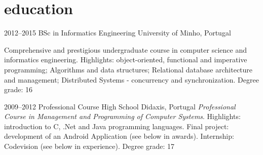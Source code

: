 \documentclass[]{friggeri-cv} %
\begin{document}
\section{education}

\begin{entrylist}
\entry
{2012--2015}
{BSc in Informatics Engineering }
{University of Minho, Portugal}
{
Comprehensive and prestigious undergraduate course in computer science and informatics engineering. Highlights: object-oriented, functional and imperative programming; Algorithms and data structures; Relational database architecture and management; Distributed Systems - concurrency and synchronization. Degree grade: 16 

}
\entry
{2009--2012}
{Professional Course {\normalfont High School}}
{Didaxis, Portugal}
{\emph{Professional Course in Management and Programming of Computer Systems}. Highlights: introduction to C, .Net and Java programming languages. Final project: development of an Android Application (see below in awards). Internship: Codevision (see below in experience). Degree grade: 17}

\end{entrylist}


\newpage
\end{document}
